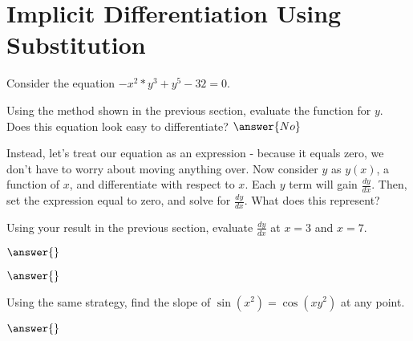 \documentclass{ximera}
\begin{document}
\section{Implicit Differentiation Using Substitution}
Consider the equation $-x^2*y^3+y^5-32 = 0$.
\begin{question}
Using the method shown in the previous section, evaluate the function for $y$. Does this equation look easy to differentiate?
$\answer{No}$

Instead, let's treat our equation as an expression - because it equals zero, we don't have to worry about moving anything over. Now consider $y$ as $y(x)$, a function of $x$, and differentiate with respect to $x$. Each $y$ term will gain $\frac{dy}{dx}$. Then, set the expression equal to zero, and solve for $\frac{dy}{dx}$. What does this represent?
\begin{freeResponse}
\end{freeResponse}
\end{question}

\begin{question}
Using your result in the previous section, evaluate $\frac{dy}{dx}$ at $x = 3$ and $x = 7$.

$\answer{}$

$\answer{}$
\end{question}
\begin{question}
Using the same strategy, find the slope of  $\sin(x^2)=\cos(xy^2)$ at any point.

$\answer{}$
\end{question}
\end{document}
